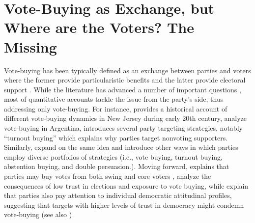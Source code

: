 \documentclass[onesided]{article}\usepackage[]{graphicx}\usepackage[]{color}
\begin{document}









\section{Vote-Buying as Exchange, but Where are the Voters? The Missing}

Vote-buying has been typically defined as an exchange between parties and voters where the former provide particularistic benefits and the latter provide electoral support \parencite{Nichter2008,Nichter2014}. While the literature has advanced a number of important questions \parencite{Hicken2011}, most of quantitative accounts tackle the issue from the party's side, thus addressing only vote-buying. For instance, \textcite{Reynolds1980} provides a historical account of different vote-buying dynamics in New Jersey during early 20th century, \textcite{Brusco2004} analyze vote-buying in Argentina, \textcite{Nichter2008} introduces several party targeting strategies, notably ``turnout buying'' which explains why parties target nonvoting supporters. Similarly, \textcite{Gans-Morse2013} expand on the same idea and introduce other ways in which parties employ diverse portfolios of strategies (i.e., vote buying, turnout buying, abstention buying, and double persuasion.). Moving forward, \textcite{Albertus2012a} explains that parties may buy votes from both swing and core voters , \textcite{Carreras2013a} analyze the consequences of low trust in elections and exposure to vote buying, while \textcite{Carlin2015} explain that parties also pay attention to individual democratic attitudinal profiles, suggesting that targets with higher levels of trust in democracy might condemn vote-buying (see also \cite{Weitz-shapiro})
\end{document}
